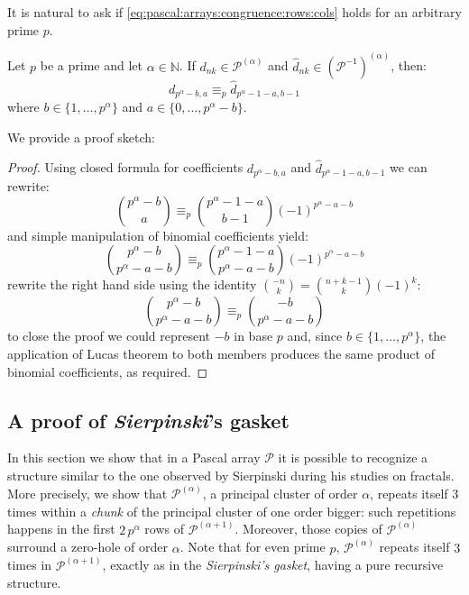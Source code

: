 It is natural to ask if \autoref{eq:pascal:arrays:congruence:rows:cols}
holds for an arbitrary prime $p$.
\begin{conjecture}
    Let $p$ be a prime and let $\alpha\in\mathbb{N}$. 
    If $d_{nk}\in\mathcal{P}^{(\alpha)}$ and
    $\hat{d}_{nk}\in\left(\mathcal{P}^{-1}\right)^{(\alpha)}$, then:
    \begin{equation}
        d_{p^\alpha -b,a} \equiv_{p} \hat{d}_{p^\alpha -1-a,b-1} 
    \end{equation}
    where $b\in\lbrace1,\ldots,p^{\alpha}\rbrace$ and 
    $a\in\lbrace 0,\ldots,p^{\alpha}-b\rbrace$.
\end{conjecture}
We provide a proof sketch:
\begin{proof}
    Using closed formula for coefficients $d_{p^\alpha -b,a}$ and $\hat{d}_{p^\alpha -1-a,b-1}$
    we can rewrite:
    \begin{displaymath}
        {{p^\alpha -b} \choose {a}} \equiv_{p} {{p^\alpha -1-a}\choose{b-1} }\left(-1\right)^{p^{\alpha}-a-b}
    \end{displaymath}
    and simple manipulation of binomial coefficients yield:
    \begin{displaymath}
        {{p^\alpha -b} \choose {p^\alpha -a-b}} \equiv_{p} 
            {{p^\alpha -1-a}\choose{p^\alpha -a-b} }\left(-1\right)^{p^{\alpha}-a-b}
    \end{displaymath}
    rewrite the right hand side using the identity ${{-n}\choose{k}}={{n+k-1}\choose{k}}(-1)^{k}$:
    \begin{displaymath}
        {{p^\alpha -b} \choose {p^\alpha -a-b}} \equiv_{p} 
            {{-b}\choose{p^\alpha -a-b} }
    \end{displaymath}
    to close the proof we could represent $-b$ in base $p$ and, 
    since $b\in\lbrace1,\ldots,p^{\alpha}\rbrace$, the application of
    Lucas theorem to both members produces the same product of binomial
    coefficients, as required.

\end{proof}

\subsection{A proof of \emph{Sierpinski}'s gasket}

In this section we show that in a Pascal array $\mathcal{P}$ it is possible to
recognize a structure similar to the one observed by Sierpinski during his
studies on fractals. More precisely, we show that $\mathcal{P}^{(\alpha)}$, a
principal cluster of order $\alpha$, repeats itself $3$ times within a
\emph{chunk} of the principal cluster of one order bigger: such repetitions
happens in the first $2\,p^{\alpha}$ rows of $\mathcal{P}^{(\alpha+1)}$.
Moreover, those copies of $\mathcal{P}^{(\alpha)}$ surround a zero-hole of
order $\alpha$. Note that for even prime $p$, $\mathcal{P}^{(\alpha)}$ repeats
itself $3$ times in $\mathcal{P}^{(\alpha+1)}$, exactly as in the
\emph{Sierpinski's gasket}, having a pure recursive structure.

